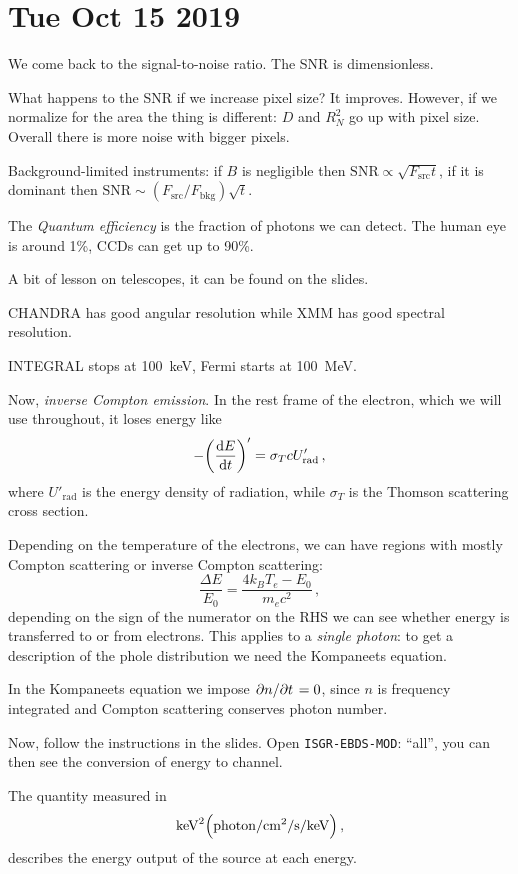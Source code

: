 \documentclass[main.tex]{subfiles}
\begin{document}
\section*{Tue Oct 15 2019}

We come back to the signal-to-noise ratio. 
The SNR is dimensionless.

What happens to the SNR if we increase pixel size?
It improves. However, if we normalize for the area the thing is different: \(D\) and \(R_N^2\) go up with pixel size. Overall there is more noise with bigger pixels.

Background-limited instruments: if \(B\) is negligible then \(\text{SNR} \propto \sqrt{F _{\text{src}} t} \), if it is dominant then \(\text{SNR} \sim (F _{\text{src}}/ F _{\text{bkg}} ) \sqrt{t} \).

The \emph{Quantum efficiency} is the fraction of photons we can detect. The human eye is around 1\%, CCDs can get up to 90\%.

A bit of lesson on telescopes, it can be found on the slides.

CHANDRA has good angular resolution while XMM has good spectral resolution.

INTEGRAL stops at \SI{100}{keV}, Fermi starts at \SI{100}{MeV}.

Now, \emph{inverse Compton emission}.
In the rest frame of the electron, which we will use throughout, it loses energy like 
%
\begin{equation}
  - \qty(\dv{E}{t} )' = \sigma _T c U' _{\text{rad}}
\,,
\end{equation}
%
where \(U' _{\text{rad}}\) is the energy density of radiation,  while \(\sigma _T\) is the Thomson scattering cross section.

Depending on the temperature of the electrons, we can have regions with mostly Compton scattering or inverse Compton scattering: 
%
\begin{equation}
  \frac{\Delta E}{E_0} = \frac{4 k_B T_e - E_0 }{m_e c^2}
\,,
\end{equation}
%
depending on the sign of the numerator on the RHS we can see whether energy is transferred to or from electrons.
This applies to a \emph{single photon}: to get a description of the phole distribution we need the Kompaneets equation.

In the Kompaneets equation we impose \(\pdv*{n}{t} = 0\), since \(n\) is frequency integrated and Compton scattering conserves photon number.

Now, follow the instructions in the slides. Open \texttt{ISGR-EBDS-MOD}: ``all'', you can then see the conversion of energy to channel.

The quantity measured in 
%
\begin{equation}
  \SI{}{keV}^2 \qty(\SI{}{photon / cm^2 / s / keV})
\,,
\end{equation}
%
describes the energy output of the source at each energy.
\end{document}
